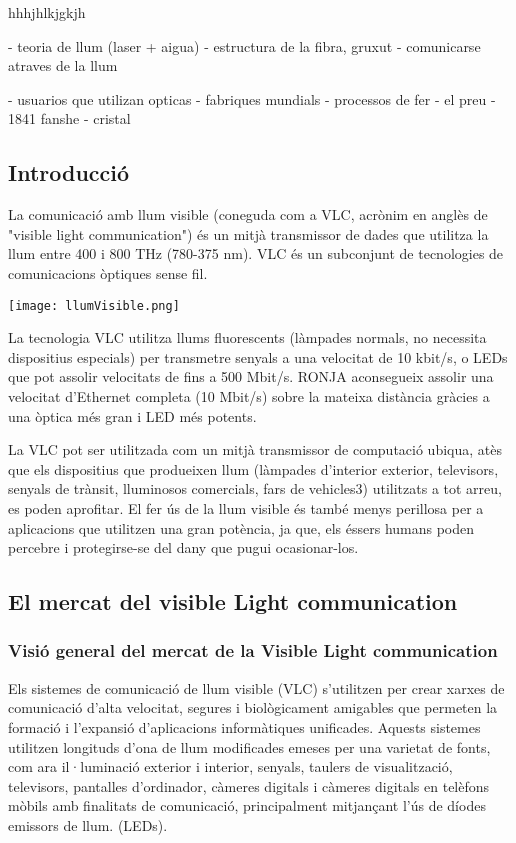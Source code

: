 

hhhjhlkjgkjh

- teoria de llum (laser + aigua)
- estructura de la fibra, gruxut
- comunicarse atraves de la llum

- usuarios que utilizan opticas
- fabriques mundials
- processos de fer
- el preu
- 1841 fanshe
- cristal

\subsection*{Introducció}
La comunicació amb llum visible (coneguda com a VLC, acrònim en anglès de "visible light communication") és un mitjà transmissor de dades que utilitza la llum entre 400 i 800 THz (780-375 nm). VLC és un subconjunt de tecnologies de comunicacions òptiques sense fil.



\begin{center}
    \texttt{[image: llumVisible.png]}\\\vfill
\end{center}

La tecnologia  VLC utilitza llums fluorescents (làmpades normals, no necessita dispositius especials) per transmetre senyals a una velocitat de 10 kbit/s, o LEDs que pot assolir velocitats de fins a 500 Mbit/s. RONJA aconsegueix assolir una velocitat d'Ethernet completa (10 Mbit/s) sobre la mateixa distància gràcies a una òptica més gran i LED més potents.

La VLC pot ser utilitzada com un mitjà transmissor de computació ubiqua, atès que els dispositius que produeixen llum (làmpades d'interior exterior, televisors, senyals de trànsit, lluminosos comercials, fars de vehicles3) utilitzats a tot arreu, es poden aprofitar. El fer ús de la llum visible és també menys perillosa per a aplicacions que utilitzen una gran potència, ja que, els éssers humans poden percebre i protegirse-se del dany que pugui ocasionar-los.




\subsection*{El mercat del visible Light communication}

\subsubsection*{Visió general del mercat de la Visible Light communication}
Els sistemes de comunicació de llum visible (VLC) s'utilitzen per crear xarxes de comunicació d'alta velocitat, segures i biològicament amigables que permeten la formació i l'expansió d'aplicacions informàtiques unificades. Aquests sistemes utilitzen longituds d'ona de llum modificades emeses per una varietat de fonts, com ara il·luminació exterior i interior, senyals, taulers de visualització, televisors, pantalles d'ordinador, càmeres digitals i càmeres digitals en telèfons mòbils amb finalitats de comunicació, principalment mitjançant l'ús de díodes emissors de llum. (LEDs).


